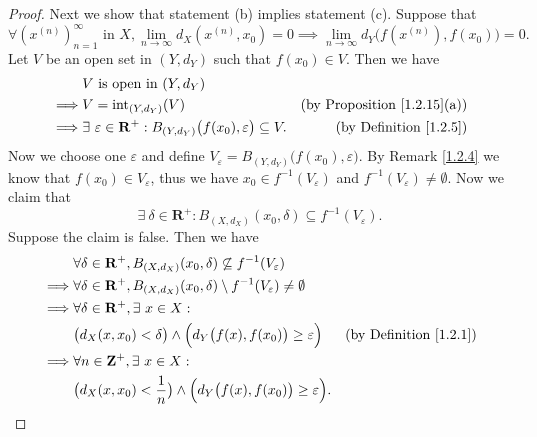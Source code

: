 \begin{proof}
    Next we show that statement (b) implies statement (c).
    Suppose that
    \[
        \forall (x^{(n)})_{n = 1}^\infty \text{ in } X, \lim_{n \to \infty} d_X(x^{(n)}, x_0) = 0 \implies \lim_{n \to \infty} d_Y\big(f(x^{(n)}), f(x_0)\big) = 0.
    \]
    Let \(V\) be an open set in \((Y, d_Y)\) such that \(f(x_0) \in V\).
    Then we have
    \begin{align*}
                 & V \text{ is open in } (Y, d_Y)                                                                                                           \\
        \implies & V = \text{int}_{(Y, d_Y)}(V)                                                                   & \text{(by Proposition \ref{1.2.15}(a))} \\
        \implies & \exists\ \varepsilon \in \mathbf{R}^+ : B_{(Y, d_Y)}\big(f(x_0), \varepsilon\big) \subseteq V. & \text{(by Definition \ref{1.2.5})}
    \end{align*}
    Now we choose one \(\varepsilon\) and define \(V_\varepsilon = B_{(Y, d_Y)}\big(f(x_0), \varepsilon\big)\).
    By Remark \ref{1.2.4} we know that \(f(x_0) \in V_\varepsilon\), thus we have \(x_0 \in f^{-1}(V_\varepsilon)\) and \(f^{-1}(V_\varepsilon) \neq \emptyset\).
    Now we claim that
    \[
        \exists\ \delta \in \mathbf{R}^+ : B_{(X, d_X)}(x_0, \delta) \subseteq f^{-1}(V_\varepsilon).
    \]
    Suppose the claim is false.
    Then we have
    \begin{align*}
                 & \forall \delta \in \mathbf{R}^+, B_{(X, d_X)}(x_0, \delta) \not\subseteq f^{-1}(V_\varepsilon)                                                 \\
        \implies & \forall \delta \in \mathbf{R}^+, B_{(X, d_X)}(x_0, \delta) \setminus f^{-1}(V_\varepsilon) \neq \emptyset                                      \\
        \implies & \forall \delta \in \mathbf{R}^+, \exists\ x \in X :                                                                                            \\
                 & \big(d_X(x, x_0) < \delta\big) \land \Big(d_Y\big(f(x), f(x_0)\big) \geq \varepsilon\Big)                 & \text{(by Definition \ref{1.2.1})} \\
        \implies & \forall n \in \mathbf{Z}^+, \exists\ x \in X :                                                                                                 \\
                 & \big(d_X(x, x_0) < \frac{1}{n}\big) \land \Big(d_Y\big(f(x), f(x_0)\big) \geq \varepsilon\Big).

\end{align*}
\end{proof}
